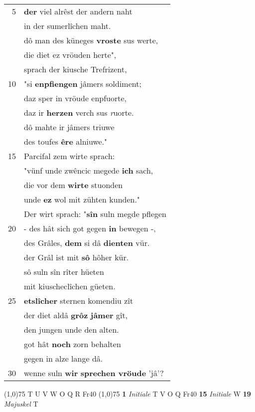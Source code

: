 \documentclass[8pt,a4paper,notitlepage]{article}
\begin{document}
\begin{table}[ht]
\begin{minipage}[t]{0.5\linewidth}
\begin{tabular}{rl}
5 & \textbf{der} viel alrêst der andern naht\\ 
 & in der sumerlîchen maht.\\ 
 & dô man des küneges \textbf{vroste} sus werte,\\ 
 & die diet ez vröuden herte",\\ 
 & sprach der kiusche Trefrizent,\\ 
10 & "si \textbf{enpfiengen} jâmers soldiment;\\ 
 & daz sper in vröude enpfuorte,\\ 
 & daz ir \textbf{herzen} verch sus \textit{r}uorte.\\ 
 & dô mahte ir jâmers triuwe\\ 
 & des toufes \textbf{êre} alniuwe."\\ 
15 & Parcifal zem wirte sprach:\\ 
 & "vünf unde zwêncic megede \textbf{ich} sach,\\ 
 & die vor dem \textbf{wirte} stuonden\\ 
 & unde \textbf{ez} wol mit zühten kunden."\\ 
 & Der wirt sprach: "\textbf{sîn} suln megde pflegen\\ 
20 & - des hât sich got gegen \textbf{in} bewegen -,\\ 
 & des Grâles, \textbf{dem} si dâ \textbf{dienten} vür.\\ 
 & der Grâl ist mit \textbf{sô} hôher kür.\\ 
 & sô suln sîn rîter hüeten\\ 
 & mit kiuscheclîchen güeten.\\ 
25 & \textbf{etslîcher} sternen komendiu zît\\ 
 & der diet aldâ \textbf{grôz} \textbf{jâmer} gît,\\ 
 & den jungen unde den alten.\\ 
 & got hât \textbf{noch} zorn behalten\\ 
 & gegen in alze lange dâ.\\ 
30 & wenne suln \textbf{wir} \textbf{sprechen vröude} 'jâ'?\\ 
\end{tabular}
\scriptsize
\line(1,0){75} \newline
T U V W O Q R Fr40 \newline
\line(1,0){75} \newline
\textbf{1} \textit{Initiale} T V O Q Fr40  \textbf{15} \textit{Initiale} W  \textbf{19} \textit{Majuskel} T  \newline

\end{minipage}
\end{table}
\end{document}
